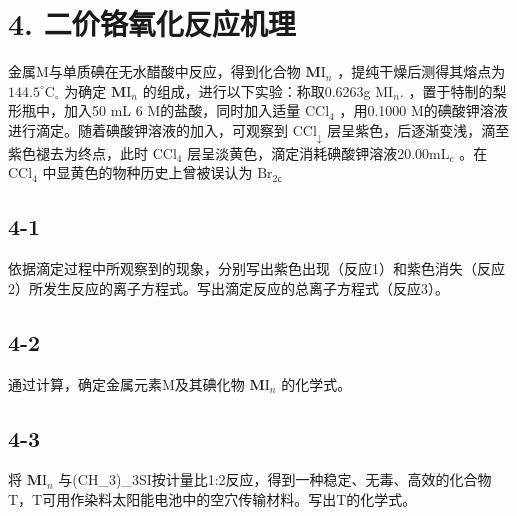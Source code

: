 \section*{4. 二价铬氧化反应机理}
⾦属M与单质碘在⽆⽔醋酸中反应，得到化合物 $\mathbf { M } \mathrm { I } _ { n }$ ，提纯⼲燥后测得其熔点为 $1 4 4 . 5 ^ { \circ } \mathrm { C } _ { \circ }$ 为确定 $\mathbf { M } \mathrm { I } _ { n }$ 的组成，进⾏以下实验：称取0.6263g $\mathrm { M I } _ { n } .$ ，置于特制的梨形瓶中，加⼊50 mL 6 M的盐酸，同时加⼊适量 $\mathrm { C C l } _ { 4 }$ ，⽤0.1000 M的碘酸钾溶液进⾏滴定。随着碘酸钾溶液的加⼊，可观察到 $\mathrm { C C l } _ { \downarrow }$ 层呈紫⾊，后逐渐变浅，滴⾄紫⾊褪去为终点，此时 $\mathrm { C C l _ { 4 } }$ 层呈淡⻩⾊，滴定消耗碘酸钾溶液20.00$\mathrm { m L } _ { \mathrm { c } }$ 。在 $\mathrm { C C l _ { 4 } }$ 中显⻩⾊的物种历史上曾被误认为 $\mathrm { B r } _ { 2 \mathsf { c } }$

\subsection*{4-1}
依据滴定过程中所观察到的现象，分别写出紫⾊出现（反应1）和紫⾊消失（反应2）所发⽣反应的离⼦⽅程式。写出滴定反应的总离⼦⽅程式（反应3）。

\subsection*{4-2}
通过计算，确定⾦属元素M及其碘化物 $\mathbf { M } \mathrm { I } _ { n }$ 的化学式。

\subsection*{4-3}
将 $\mathbf { M } \mathrm { I } _ { n }$ 与(CH_{3})_{3}SI按计量⽐1:2反应，得到⼀种稳定、⽆毒、⾼效的化合物T，T可⽤作染料太阳能电池中的空⽳传输材料。写出T的化学式。
